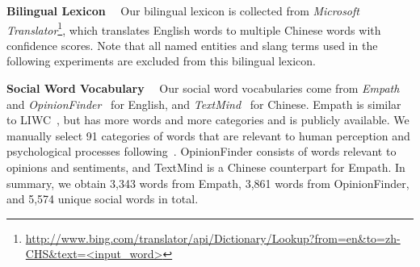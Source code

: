 \textbf{Bilingual Lexicon}~~
\label{sec:blpre}
Our bilingual lexicon is collected from \textit{Microsoft Translator}\footnote{\scriptsize{\url{http://www.bing.com/translator/api/Dictionary/Lookup?from=en&to=zh-CHS&text=<input_word>}}}, which translates English words to multiple
Chinese words with confidence scores. 
{Note that all named entities and slang terms used
	in the following experiments are excluded from this bilingual lexicon.}



\textbf{Social Word Vocabulary}~~
\label{sec:sv}
Our social word vocabularies come from 
\textit{Empath}~\cite{fast2016empath} and \textit{OpinionFinder}~\cite{choi2005identifying} 
for English, and \textit{TextMind}~\cite{gao2013developing} for Chinese.
Empath is similar to LIWC~\cite{Tausczik_2009},
but has more words and more categories and is publicly available. 
We manually select 91 categories of words that are 
relevant to human perception and psychological processes following~\citet{Garimella2016IdentifyingCD}. 
OpinionFinder consists of words relevant to opinions and sentiments, and TextMind is a Chinese counterpart for Empath.
%
In summary, we obtain 3,343 words from Empath, 3,861 words from OpinionFinder, 
and 5,574 unique social words in total. 



